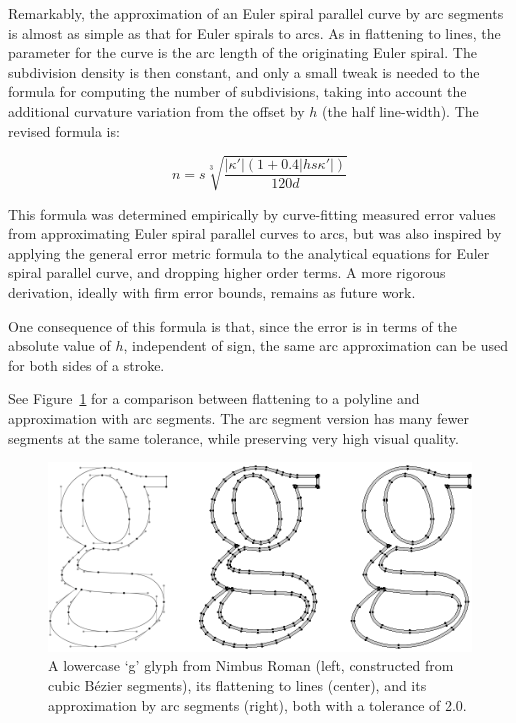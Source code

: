 \documentclass[sigconf, nonacm]{acmart}
\begin{document}
Remarkably, the approximation of an Euler spiral parallel curve by arc segments is almost as simple as that for Euler spirals to arcs. As in flattening to lines, the parameter for the curve is the arc length of the originating Euler spiral. The subdivision density is then constant, and only a small tweak is needed to the formula for computing the number of subdivisions, taking into account the additional curvature variation from the offset by $h$ (the half line-width). The revised formula is:

\[
    n = s\sqrt[3]{\frac{|\kappa'|(1+0.4|hs\kappa'|)}{120d}}
\]

This formula was determined empirically by curve-fitting measured error values from approximating Euler spiral parallel curves to arcs, but was also inspired by applying the general error metric formula to the analytical equations for Euler spiral parallel curve, and dropping higher order terms. A more rigorous derivation, ideally with firm error bounds, remains as future work.

One consequence of this formula is that, since the error is in terms of the absolute value of $h$, independent of sign, the same arc approximation can be used for both sides of a stroke.

See Figure~\ref{fig:g_comparison} for a comparison between flattening to a polyline and approximation with arc segments. The arc segment version has many fewer segments at the same tolerance, while preserving very high visual quality.

\begin{figure}
    \includegraphics[scale=0.65]{g_comparison}
    \caption{A lowercase `g' glyph from Nimbus Roman (left, constructed from cubic Bézier segments), its flattening to lines (center), and its approximation by arc segments (right), both with a tolerance of 2.0.}
    \label{fig:g_comparison}
\end{figure}
\end{document}
